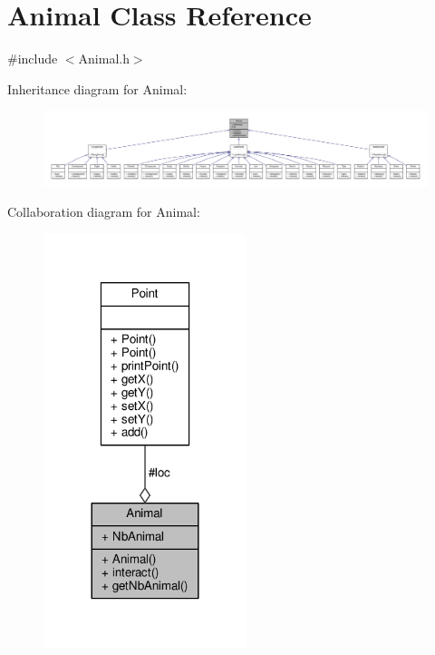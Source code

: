 \hypertarget{classAnimal}{}\section{Animal Class Reference}
\label{classAnimal}


{\ttfamily \#include $<$Animal.\+h$>$}



Inheritance diagram for Animal\+:
\nopagebreak
\begin{figure}[H]
\begin{center}
\leavevmode
\includegraphics[width=350pt]{classAnimal__inherit__graph}
\end{center}
\end{figure}


Collaboration diagram for Animal\+:
\nopagebreak
\begin{figure}[H]
\begin{center}
\leavevmode
\includegraphics[width=168pt]{classAnimal__coll__graph}
\end{center}
\end{figure}
